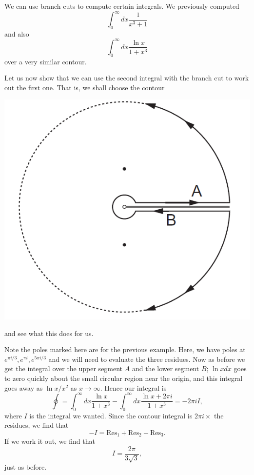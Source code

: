 We can use branch cuts to compute certain integrals. We previously computed
\begin{equation}
    \int_0^\infty dx \frac{1}{x^3+1}
\end{equation}
and also
\begin{equation}
    \int_0^\infty dx \frac{\ln x}{1+x^3}
\end{equation}
over a very similar contour.
\begin{exm}
    Let us now show that we can use the second integral with the branch cut to work out the first one. That is, we shall choose the contour
    \begin{center}
    \includegraphics{2020/02/20200224_contour.PNG}
    \end{center}
    and see what this does for us.
    
    Note the poles marked here are for the previous example. Here, we have poles at $e^{\pi i/3},e^{\pi i}, e^{5\pi i /3}$ and we will need to evaluate the three residues. Now as before we get the integral over the upper segment $A$ and the lower segment $B$; $\ln x dx$ goes to zero quickly about the small circular region near the origin, and this integral goes away as $\ln x/x^2$ as $x\to \infty$. Hence our integral is
    \begin{equation}
        \oint = \int_0^\infty dx \frac{\ln x}{1+x^3} - \int_0^\infty dx \frac{\ln x +2\pi i}{1+x^3} = -2\pi i I,
    \end{equation}
    where $I$ is the integral we wanted. Since the contour integral is $2\pi i\times{}$ the residues, we find that
    \begin{equation}
        -I= \text{Res}_1 + \text{Res}_2 + \text{Res}_3.
    \end{equation}
    If we work it out, we find that
    \begin{equation}
        I= \frac{2\pi}{3\sqrt{3}},
    \end{equation}
    just as before.
\end{exm}

